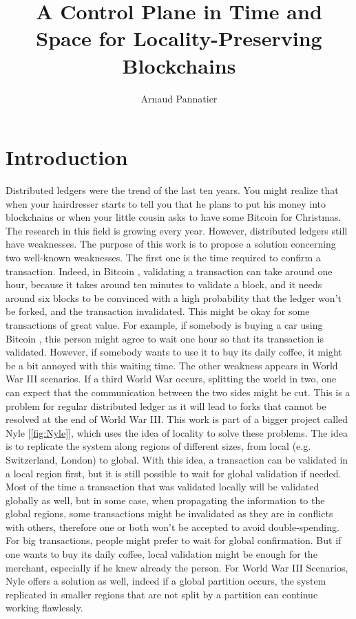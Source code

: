 \documentclass[a4paper,11pt,oneside]{report}
\title{A Control Plane in Time and Space for Locality-Preserving Blockchains}
\author{Arnaud Pannatier}
\begin{document}
\maketitle 

\maketoc

\chapter{Introduction} %

Distributed ledgers were the trend of the last ten years. You might realize that when your hairdresser starts to tell you that he plans to put his money into blockchains or when your little cousin asks to have some Bitcoin \cite{Nakamoto2009} for Christmas. The research in this field is growing every year. However, distributed ledgers still have weaknesses. The purpose of this work is to propose a solution concerning two
well-known weaknesses. The first one is the time required to confirm a transaction. 
Indeed, in Bitcoin \cite{Nakamoto2009}, validating a transaction can take around one
hour, because it takes around ten minutes to validate a block, and it needs
around six blocks to be convinced with a high probability that the ledger won't
be forked, and the transaction invalidated. This might be okay for some
transactions of great value. For example, if somebody is buying a car using
Bitcoin \cite{Nakamoto2009}, this person might agree to wait one hour so that its transaction is
validated. However, if somebody wants to use it to buy its daily coffee, it
might be a bit annoyed with this waiting time. The other weakness appears in World War
III scenarios. If a third World War occurs, splitting the world in two, one can
expect that the communication between the two sides might be cut. This is a
problem for regular distributed ledger as it will lead to forks that cannot be
resolved at the end of World War III. This work is part of a bigger project called Nyle
[\autoref{fig:Nyle}], which uses the idea of locality to solve these problems.
The idea is to replicate the system along regions of different sizes, from
local (e.g. Switzerland, London) to global. With this idea, a transaction can
be validated in a local region first, but it is still possible to wait for global
validation if needed. Most of the time a transaction that was validated locally will be
validated globally as well, but in some case, when propagating the information
to the global regions, some transactions might be invalidated as they are in conflicts with others, therefore one or both won't be accepted to avoid double-spending. For big transactions, people might prefer to wait for global
confirmation. But if one wants to buy its daily coffee, local validation might
be enough for the merchant, especially if he knew already the person. For
World War III Scenarios, Nyle offers a solution as well, indeed if a global
partition occurs, the system replicated in smaller regions that are not split
by a partition can continue working flawlessly. 
\end{document}
